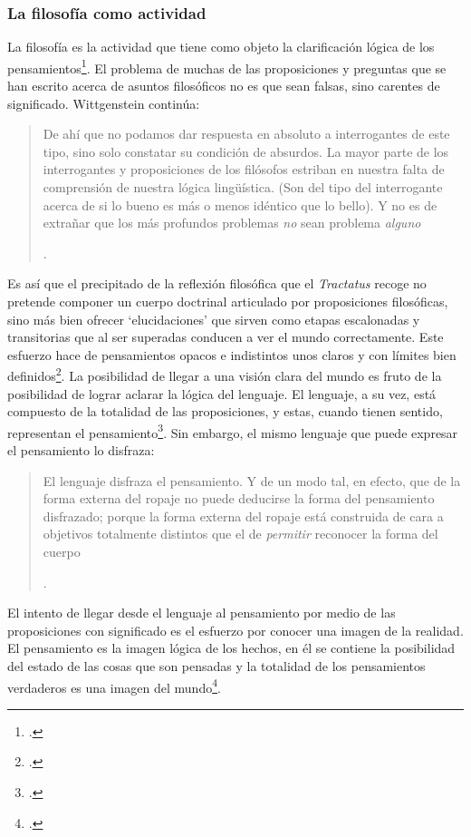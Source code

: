 \subsubsection{La filosofía como actividad}

La filosofía es la actividad que tiene como objeto la clarificación lógica de los pensamientos\footcite[\S4.112]{wittgenstein1922tractatuses}. El problema de muchas de las proposiciones y preguntas que se han escrito acerca de asuntos filosóficos no es que sean falsas, sino carentes de significado. Wittgenstein continúa: \blockquote[{\Cite[\S4.003]{wittgenstein1922tractatuses}}.]{De ahí que no podamos dar respuesta en absoluto a interrogantes de este tipo, sino solo constatar su condición de absurdos. La mayor parte de los interrogantes y proposiciones de los filósofos estriban en nuestra falta de comprensión de nuestra lógica lingüística. (Son del tipo del interrogante acerca de si lo bueno es más o menos idéntico que lo bello). Y no es de extrañar que los más profundos problemas \emph{no} sean problema \emph{alguno}}. Es así que el precipitado de la reflexión filosófica que el \emph{Tractatus} recoge no pretende componer un cuerpo doctrinal articulado por proposiciones filosóficas, sino más bien ofrecer `elucidaciones' que sirven como etapas escalonadas y transitorias que al ser superadas conducen a ver el mundo correctamente. Este esfuerzo hace de pensamientos opacos e indistintos unos claros y con límites bien definidos\footcite[Cf.][\S4.112 y \S6.54]{wittgenstein1922tractatuses}. La posibilidad de llegar a una visión clara del mundo es fruto de la posibilidad de lograr aclarar la lógica del lenguaje. El lenguaje, a su vez, está compuesto de la totalidad de las proposiciones, y estas, cuando tienen sentido, representan el pensamiento\footcite[Cf.][\S4 y \S4.001]{wittgenstein1922tractatuses}. Sin embargo, el mismo lenguaje que puede expresar el pensamiento lo disfraza: \blockquote[{\Cite[\S4.002]{wittgenstein1922tractatuses}}.]{El lenguaje disfraza el pensamiento. Y de un modo tal, en efecto, que de la forma externa del ropaje no puede deducirse la forma del pensamiento disfrazado; porque la forma externa del ropaje está construida de cara a objetivos totalmente distintos que el de \emph{permitir} reconocer la forma del cuerpo}.

El intento de llegar desde el lenguaje al pensamiento por medio de las proposiciones con significado es el esfuerzo por conocer una imagen de la realidad. El pensamiento es la imagen lógica de los hechos, en él se contiene la posibilidad del estado de las cosas que son pensadas y la totalidad de los pensamientos verdaderos es una imagen del mundo\footcite[Cf.][\S3 y \S3.001]{wittgenstein1922tractatuses}.

